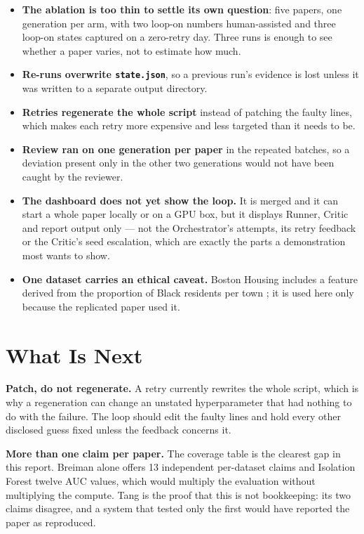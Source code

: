 \documentclass[10pt,twocolumn]{article}
\begin{document}
\begin{itemize}
  \item \textbf{The ablation is too thin to settle its own question}: five papers, one generation
    per arm, with two loop-on numbers human-assisted and three loop-on states captured on a
    zero-retry day. Three runs is enough to see whether a paper varies, not to estimate how much.
  \item \textbf{Re-runs overwrite \texttt{state.json}}, so a previous run's evidence is lost
    unless it was written to a separate output directory.
  \item \textbf{Retries regenerate the whole script} instead of patching the faulty lines, which
    makes each retry more expensive and less targeted than it needs to be.
  \item \textbf{Review ran on one generation per paper} in the repeated batches, so a deviation
    present only in the other two generations would not have been caught by the reviewer.
  \item \textbf{The dashboard does not yet show the loop.} It is merged and it can start a whole
    paper locally or on a GPU box, but it displays Runner, Critic and report output only --- not
    the Orchestrator's attempts, its retry feedback or the Critic's seed escalation, which are
    exactly the parts a demonstration most wants to show.
  \item \textbf{One dataset carries an ethical caveat.} Boston Housing includes a feature derived
    from the proportion of Black residents per town \cite{harrison1978hedonic}; it is used here
    only because the replicated paper used it.
\end{itemize}

\section{What Is Next}
\label{sec:future}

\textbf{Patch, do not regenerate.} A retry currently rewrites the whole script, which is why a
regeneration can change an unstated hyperparameter that had nothing to do with the failure. The
loop should edit the faulty lines and hold every other disclosed guess fixed unless the feedback
concerns it.

\textbf{More than one claim per paper.} The coverage table is the clearest gap in this report.
Breiman alone offers 13 independent per-dataset claims and Isolation Forest twelve AUC values,
which would multiply the evaluation without multiplying the compute. Tang is the proof that this
is not bookkeeping: its two claims disagree, and a system that tested only the first would have
reported the paper as reproduced.
\end{document}
